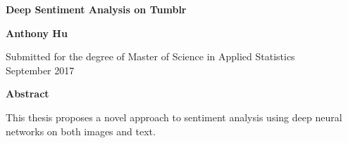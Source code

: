 \newpage
\thispagestyle{plain}
\begin{center}
  \textbf{\Large Deep Sentiment Analysis on Tumblr}

  \vspace*{1cm}
  \textbf{\large Anthony Hu}

  \vspace*{0.5cm}
  {\large Submitted for the degree of Master of Science in Applied Statistics\\ September 2017}

  \vspace*{1cm}
  \textbf{\large Abstract}
\end{center}
This thesis proposes a novel approach to sentiment analysis using deep neural networks on both images and text.

\begin{spacing}{0.95}
\tableofcontents
\end{spacing}
\listoffigures
\listoftables
\clearpage











